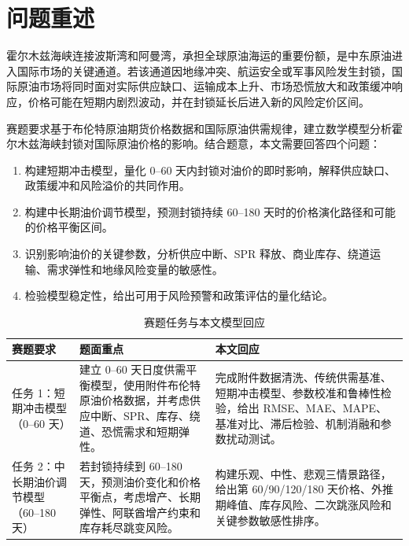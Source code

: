 \section{问题重述}

霍尔木兹海峡连接波斯湾和阿曼湾，承担全球原油海运的重要份额，是中东原油进入国际市场的关键通道。若该通道因地缘冲突、航运安全或军事风险发生封锁，国际原油市场将同时面对实际供应缺口、运输成本上升、市场恐慌放大和政策缓冲响应，价格可能在短期内剧烈波动，并在封锁延长后进入新的风险定价区间。

赛题要求基于布伦特原油期货价格数据和国际原油供需规律，建立数学模型分析霍尔木兹海峡封锁对国际原油价格的影响。结合题意，本文需要回答四个问题：

\begin{enumerate}
  \item 构建短期冲击模型，量化 0--60 天内封锁对油价的即时影响，解释供应缺口、政策缓冲和风险溢价的共同作用。
  \item 构建中长期油价调节模型，预测封锁持续 60--180 天时的价格演化路径和可能的价格平衡区间。
  \item 识别影响油价的关键参数，分析供应中断、SPR 释放、商业库存、绕道运输、需求弹性和地缘风险变量的敏感性。
  \item 检验模型稳定性，给出可用于风险预警和政策评估的量化结论。
\end{enumerate}

\begin{table}[!htbp]
\centering
\caption{赛题任务与本文模型回应}
\begin{tabularx}{\linewidth}{lX X}
\toprule
赛题要求 & 题面重点 & 本文回应 \\
\midrule
任务 1：短期冲击模型（0--60 天） & 建立 0--60 天日度供需平衡模型，使用附件布伦特原油价格数据，并考虑供应中断、SPR、库存、绕道、恐慌需求和短期弹性。 & 完成附件数据清洗、传统供需基准、短期冲击模型、参数校准和鲁棒性检验，给出 RMSE、MAE、MAPE、基准对比、滞后检验、机制消融和参数扰动测试。 \\
任务 2：中长期油价调节模型（60--180 天） & 若封锁持续到 60--180 天，预测油价变化和价格平衡点，考虑增产、长期弹性、阿联酋增产约束和库存耗尽跳变风险。 & 构建乐观、中性、悲观三情景路径，给出第 60/90/120/180 天价格、外推期峰值、库存风险、二次跳涨风险和关键参数敏感性排序。 \\
\bottomrule
\end{tabularx}
\end{table}
